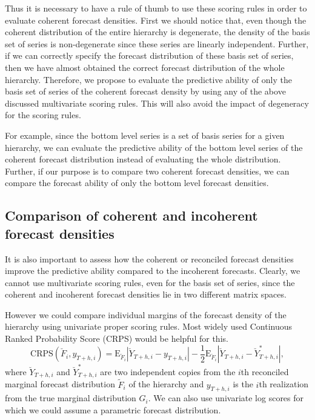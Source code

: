 \documentclass[a4paper, 11pt]{article}
\def\E{\text{E}}
\begin{document}
Thus it is necessary to have a rule of thumb to use these scoring rules in order to evaluate coherent forecast densities. First we should notice that, even though the coherent distribution of the entire hierarchy is degenerate, the density of the basis set of series is non-degenerate since these series are linearly independent. Further, if we can correctly specify the forecast distribution of these basis set of series, then we have almost obtained the correct forecast distribution of the whole hierarchy. Therefore, we propose to evaluate the predictive ability of only the basis set of series of the coherent forecast density by using any of the above discussed multivariate scoring rules. This will also avoid the impact of degeneracy for the scoring rules.

For example, since the bottom level series is a set of basis series for a given hierarchy, we can evaluate the predictive ability of the bottom level series of the coherent forecast distribution instead of evaluating the whole distribution. Further, if our purpose is to compare two coherent forecast densities, we can compare the forecast ability of only the bottom level forecast densities.

\subsection{Comparison of coherent and incoherent forecast densities}

It is also important to assess how the coherent or reconciled forecast densities improve the predictive ability compared to the incoherent forecasts. Clearly, we cannot use multivariate scoring rules, even for the basis set of series, since the coherent and incoherent forecast densities lie in two different matrix spaces.

However we could compare individual margins of the forecast density of the hierarchy using univariate proper scoring rules. Most widely used Continuous Ranked Probability Score (CRPS) would be helpful for this.
\begin{equation} \label{eq:(3.6)}
\text{CRPS}(\breve{F}_i,y_{T+h,i}) = \E_{\breve{F}_i}|\breve{Y}_{T+h,i}-y_{T+h,i}| - \frac{1}{2}\E_{\breve{F}_i}|\breve{Y}_{T+h,i}-\breve{Y}^*_{T+h,i}|,
\end{equation}
where $\breve{Y}_{T+h,i}$ and $\breve{Y}^*_{T+h,i}$ are two independent copies from the $i$th reconciled marginal forecast distribution $\tilde{F}_i$ of the hierarchy and $y_{T+h,i}$ is the $i$th realization from the true marginal distribution $G_i$. We can also use univariate log scores for which we could assume a parametric forecast distribution.
\end{document}
